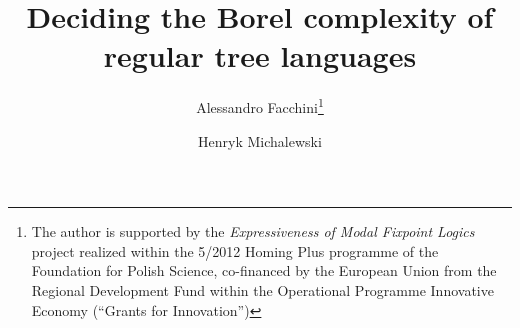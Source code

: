 \documentclass{llncs}
\begin{document}
\frontmatter          

\pagestyle{headings}  

\addtocmark{} 

\mainmatter            

\title{Deciding the Borel complexity of regular tree languages}


\author{Alessandro Facchini\thanks{The author is supported by the \emph{Expressiveness of Modal Fixpoint Logics} project realized within the 5/2012 Homing Plus programme of the Foundation for Polish Science, co-financed by the European Union from the Regional Development Fund within the Operational Programme Innovative Economy (``Grants for Innovation'')} \and Henryk Michalewski}


\maketitle              

















\end{document}
